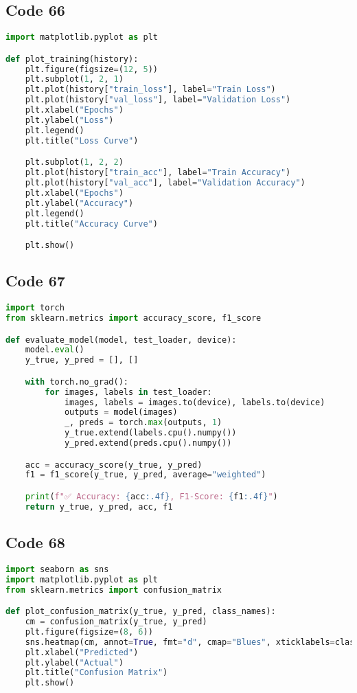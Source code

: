 \documentclass{article}
\begin{document}
\subsection*{Code 66}
\begin{lstlisting}[language=Python]
import matplotlib.pyplot as plt

def plot_training(history):
    plt.figure(figsize=(12, 5))
    plt.subplot(1, 2, 1)
    plt.plot(history["train_loss"], label="Train Loss")
    plt.plot(history["val_loss"], label="Validation Loss")
    plt.xlabel("Epochs")
    plt.ylabel("Loss")
    plt.legend()
    plt.title("Loss Curve")

    plt.subplot(1, 2, 2)
    plt.plot(history["train_acc"], label="Train Accuracy")
    plt.plot(history["val_acc"], label="Validation Accuracy")
    plt.xlabel("Epochs")
    plt.ylabel("Accuracy")
    plt.legend()
    plt.title("Accuracy Curve")

    plt.show()

\end{lstlisting}

\subsection*{Code 67}
\begin{lstlisting}[language=Python]
import torch
from sklearn.metrics import accuracy_score, f1_score

def evaluate_model(model, test_loader, device):
    model.eval()
    y_true, y_pred = [], []

    with torch.no_grad():
        for images, labels in test_loader:
            images, labels = images.to(device), labels.to(device)
            outputs = model(images)
            _, preds = torch.max(outputs, 1)
            y_true.extend(labels.cpu().numpy())
            y_pred.extend(preds.cpu().numpy())

    acc = accuracy_score(y_true, y_pred)
    f1 = f1_score(y_true, y_pred, average="weighted")

    print(f"✅ Accuracy: {acc:.4f}, F1-Score: {f1:.4f}")
    return y_true, y_pred, acc, f1

\end{lstlisting}

\subsection*{Code 68}
\begin{lstlisting}[language=Python]
import seaborn as sns
import matplotlib.pyplot as plt
from sklearn.metrics import confusion_matrix

def plot_confusion_matrix(y_true, y_pred, class_names):
    cm = confusion_matrix(y_true, y_pred)
    plt.figure(figsize=(8, 6))
    sns.heatmap(cm, annot=True, fmt="d", cmap="Blues", xticklabels=class_names, yticklabels=class_names)
    plt.xlabel("Predicted")
    plt.ylabel("Actual")
    plt.title("Confusion Matrix")
    plt.show()

\end{lstlisting}
\end{document}
